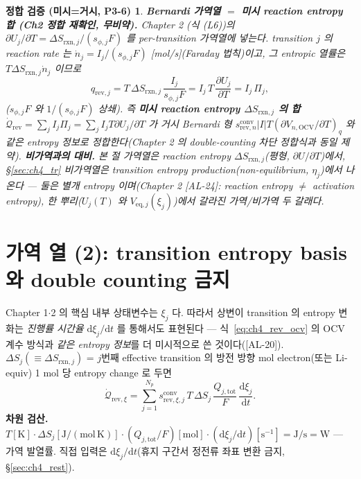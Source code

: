 \documentclass[11pt,a4paper]{article}
\newtheorem*{verifybox}{정합 검증 (미시=거시, P3-6)}
\newcommand{\dd}{\mathrm{d}}
\newcommand{\eq}{\mathrm{eq}}
\newcommand{\OCV}{\mathrm{OCV}}
\newcommand{\tot}{\mathrm{tot}}
\newcommand{\rev}{\mathrm{rev}}
\newcommand{\rxn}{\mathrm{rxn}}
\newcommand{\conv}{\mathrm{conv}}
\newcommand{\AL}[1]{\textsf{[AL-#1]}}
\begin{document}
\begin{verifybox}
\textbf{Bernardi 가역열 $=$ 미시 reaction entropy 합 (Ch2 정합 재확인, 무비약).} Chapter 2 (식 (L6))의
$\partial U_j/\partial T=\Delta S_{\rxn,j}/(s_{\phi,j}F)$ 를 per-transition 가역열에 넣는다. transition $j$ 의
reaction rate 는 $\dot n_j=I_j/(s_{\phi,j}F)$ [mol/s](Faraday 법칙)이고, 그 entropic 열률은 $T\Delta S_{\rxn,j}\dot n_j$
이므로
\begin{equation}
q_{\rev,j}=T\,\Delta S_{\rxn,j}\,\frac{I_j}{s_{\phi,j}F}
=I_j\,T\,\frac{\partial U_j}{\partial T}=I_j\,\Pi_j,
\label{eq:ch4_qrev_micro}
\end{equation}
($s_{\phi,j}F$ 와 $1/(s_{\phi,j}F)$ 상쇄). 즉 \textbf{미시 reaction entropy $\Delta S_{\rxn,j}$ 의 합}
$\dot{\mathcal Q}_{\rev}=\sum_j I_j\Pi_j=\sum_j I_j T\partial U_j/\partial T$ 가 거시 Bernardi 형
$s_{\rev,n}^{\conv}|I|T(\partial V_{n,\OCV}/\partial T)_q$ 와 같은 entropy 정보로 정합한다(Chapter 2 의
double-counting 차단 정합식과 동일 제약). \textbf{비가역과의 대비.} 본 절 가역열은 \emph{reaction} entropy
$\Delta S_{\rxn,j}$(평형, $\partial U/\partial T$)에서, \S\ref{sec:ch4_tr} 비가역열은 transition entropy
production(non-equilibrium, $\eta_j$)에서 나온다 — 둘은 별개 entropy 이며(Chapter 2 \AL{24}: reaction entropy
$\ne$ activation entropy), 한 뿌리($U_j(T)$ 와 $V_{\eq,j}(\xi_j)$)에서 갈라진 가역/비가역 두 갈래다.
\end{verifybox}

\section{가역 열 (2): transition entropy basis 와 double counting 금지}\label{sec:ch4_revxi}
Chapter 1$\cdot$2 의 핵심 내부 상태변수는 $\xi_j$ 다. 따라서 상변이 transition 의 entropy 변화는 \emph{진행률
시간율} $\dd\xi_j/\dd t$ 를 통해서도 표현된다 — 식~\eqref{eq:ch4_rev_ocv} 의 OCV 계수 방식과 \emph{같은 entropy
정보}를 더 미시적으로 쓴 것이다(\AL{20}). $\Delta S_j(\equiv\Delta S_{\rxn,j})$ = $j$번째 effective transition
의 방전 방향 mol electron(또는 Li-equiv) 1 mol 당 entropy change 로 두면
\begin{equation}
\dot{\mathcal Q}_{\rev,\xi}=\sum_{j=1}^{N_p}s_{\rev,\xi,j}^{\conv}\,T\,\Delta S_j\,\frac{Q_{j,\tot}}{F}\,\frac{\dd\xi_j}{\dd t}.
\label{eq:ch4_rev_xi}
\end{equation}
\textbf{차원 검산.} $T[\mathrm K]\cdot\Delta S_j[\mathrm{J/(mol\,K)}]\cdot(Q_{j,\tot}/F)[\mathrm{mol}]\cdot
(\dd\xi_j/\dd t)[\mathrm{s^{-1}}]=\mathrm{J/s}=\mathrm W$ — 가역 발열률. 직접 입력은 $\dd\xi_j/\dd t$(휴지 구간서
정전류 좌표 변환 금지, \S\ref{sec:ch4_rest}).
\end{document}
